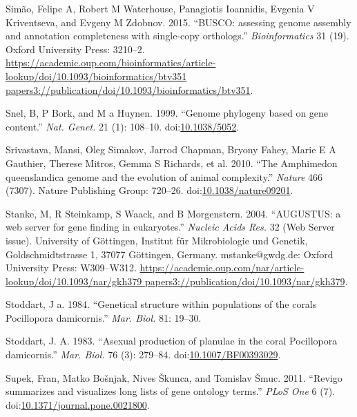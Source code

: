 \documentclass[]{elsarticle} %
\begin{document}
\hypertarget{ref-Simao2015}{}
Simão, Felipe A, Robert M Waterhouse, Panagiotis Ioannidis, Evgenia V
Kriventseva, and Evgeny M Zdobnov. 2015. ``BUSCO: assessing genome
assembly and annotation completeness with single-copy orthologs.''
\emph{Bioinformatics} 31 (19). Oxford University Press: 3210--2.
\href{https://academic.oup.com/bioinformatics/article-lookup/doi/10.1093/bioinformatics/btv351\%20papers3://publication/doi/10.1093/bioinformatics/btv351}{https://academic.oup.com/bioinformatics/article-lookup/doi/10.1093/bioinformatics/btv351 papers3://publication/doi/10.1093/bioinformatics/btv351}.

\hypertarget{ref-Snel1999}{}
Snel, B, P Bork, and M a Huynen. 1999. ``Genome phylogeny based on gene
content.'' \emph{Nat. Genet.} 21 (1): 108--10.
doi:\href{https://doi.org/10.1038/5052}{10.1038/5052}.

\hypertarget{ref-Srivastava2010}{}
Srivastava, Mansi, Oleg Simakov, Jarrod Chapman, Bryony Fahey, Marie E A
Gauthier, Therese Mitros, Gemma S Richards, et al. 2010. ``The
Amphimedon queenslandica genome and the evolution of animal
complexity.'' \emph{Nature} 466 (7307). Nature Publishing Group:
720--26.
doi:\href{https://doi.org/10.1038/nature09201}{10.1038/nature09201}.

\hypertarget{ref-Stanke2004}{}
Stanke, M, R Steinkamp, S Waack, and B Morgenstern. 2004. ``AUGUSTUS: a
web server for gene finding in eukaryotes.'' \emph{Nucleic Acids Res.}
32 (Web Server issue). University of Göttingen, Institut für
Mikrobiologie und Genetik, Goldschmidtstrasse 1, 37077 Göttingen,
Germany. mstanke@gwdg.de: Oxford University Press: W309--W312.
\href{https://academic.oup.com/nar/article-lookup/doi/10.1093/nar/gkh379\%20papers3://publication/doi/10.1093/nar/gkh379}{https://academic.oup.com/nar/article-lookup/doi/10.1093/nar/gkh379 papers3://publication/doi/10.1093/nar/gkh379}.

\hypertarget{ref-Stoddart1984}{}
Stoddart, J a. 1984. ``Genetical structure within populations of the
corals Pocillopora damicornis.'' \emph{Mar. Biol.} 81: 19--30.

\hypertarget{ref-Stoddart1983}{}
Stoddart, J. A. 1983. ``Asexual production of planulae in the coral
Pocillopora damicornis.'' \emph{Mar. Biol.} 76 (3): 279--84.
doi:\href{https://doi.org/10.1007/BF00393029}{10.1007/BF00393029}.

\hypertarget{ref-Supek2011}{}
Supek, Fran, Matko Bošnjak, Nives Škunca, and Tomislav Šmuc. 2011.
``Revigo summarizes and visualizes long lists of gene ontology terms.''
\emph{PLoS One} 6 (7).
doi:\href{https://doi.org/10.1371/journal.pone.0021800}{10.1371/journal.pone.0021800}.
\end{document}
